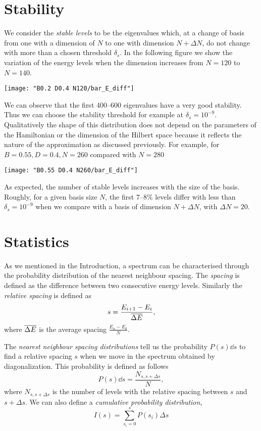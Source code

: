 \documentclass[../thesis.tex]{subfiles}
\begin{document}
\section{Stability}

We consider the \emph{stable levels} to be the eigenvalues which, at a change of
basis from one with a dimension of $N$ to one with dimension \(N+ \Delta N\),
do not change with more than a chosen threshold \(\delta_s\).
In the following figure we show the variation of the energy levels when
the dimension increases from \(N = 120\) to \(N = 140\).

\begin{center}
  \texttt{[image: "B0.2 D0.4 N120/bar\_E\_diff"]}
\end{center}

We can observe that the first 400--600 eigenvalues have a very good stability.
Thus we can choose the stability threshold for example at \(\delta_s = 10^{-9}\).
Qualitatively the shape of this distribution does not depend on the parameters of
the Hamiltonian or the dimension of the Hilbert space because it reflects the nature
of the approximation as discussed previously.
For example, for \(B = 0.55, D = 0.4, N = 260\) compared
with \(N = 280\)

\begin{center}
  \texttt{[image: "B0.55 D0.4 N260/bar\_E\_diff"]}
\end{center}

As expected, the number of stable levels increases with the size of the basis.
Roughly, for a given basis size $N$, the first 7--8\% levels differ with less
than \(\delta_s = 10^{-9}\) when we compare with a basis of dimension
\(N + \Delta N\), with \(\Delta N = 20\).

\section{Statistics}

As we mentioned in the Introduction, a spectrum can be characterised through the
probability distribution of the nearest neighbour spacing.
The \emph{spacing} is defined as the difference between two consecutive
energy levels. Similarly the \emph{relative spacing} is defined as
\[
  s = \frac{E_{i+1} - E_i}{\overline{\Delta E}},
\]
where \(\overline{\Delta E}\) is the average spacing \(\frac{E_n - E_0}{N}\).

The \emph{nearest neighbour spacing distributions} tell us the probability \(P(s)\dd{s}\) to
find a relative spacing $s$ when we move in the spectrum obtained by diagonalization.
This probability is defined as follows
\[
  P(s)\dd{s} = \frac{N_{s,s+\Delta s}}{N},
\]
where \(N_{s,s+\Delta s}\) is the number of levels with the relative spacing
between \(s\) and \(s+ \Delta s\).
We can also define a \emph{cumulative probability distribution},
\[
  I(s) = \sum_{s_i=0}^s P(s_i) \Delta s
\]
\end{document}
